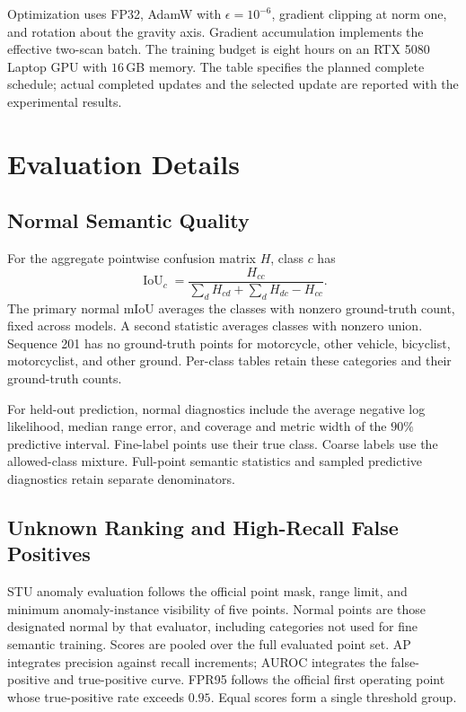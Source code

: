\documentclass{article}
\begin{document}
Optimization uses FP32, AdamW with $\epsilon=10^{-6}$, gradient clipping at norm one, and rotation about the gravity axis. Gradient accumulation implements the effective two-scan batch. The training budget is eight hours on an RTX 5080 Laptop GPU with $16$\,GB memory. The table specifies the planned complete schedule; actual completed updates and the selected update are reported with the experimental results.

\section{Evaluation Details}
\label{app:evaluation}
\subsection{Normal Semantic Quality}
For the aggregate pointwise confusion matrix $H$, class $c$ has
\begin{equation}
 \operatorname{IoU}_c=\frac{H_{cc}}{\sum_d H_{cd}+\sum_d H_{dc}-H_{cc}}.
\end{equation}
The primary normal mIoU averages the classes with nonzero ground-truth count, fixed across models. A second statistic averages classes with nonzero union. Sequence 201 has no ground-truth points for motorcycle, other vehicle, bicyclist, motorcyclist, and other ground. Per-class tables retain these categories and their ground-truth counts.

For held-out prediction, normal diagnostics include the average negative log likelihood, median range error, and coverage and metric width of the $90\%$ predictive interval. Fine-label points use their true class. Coarse labels use the allowed-class mixture. Full-point semantic statistics and sampled predictive diagnostics retain separate denominators.

\subsection{Unknown Ranking and High-Recall False Positives}
STU anomaly evaluation follows the official point mask, range limit, and minimum anomaly-instance visibility of five points. Normal points are those designated normal by that evaluator, including categories not used for fine semantic training. Scores are pooled over the full evaluated point set. AP integrates precision against recall increments; AUROC integrates the false-positive and true-positive curve. FPR95 follows the official first operating point whose true-positive rate exceeds $0.95$. Equal scores form a single threshold group.
\end{document}
